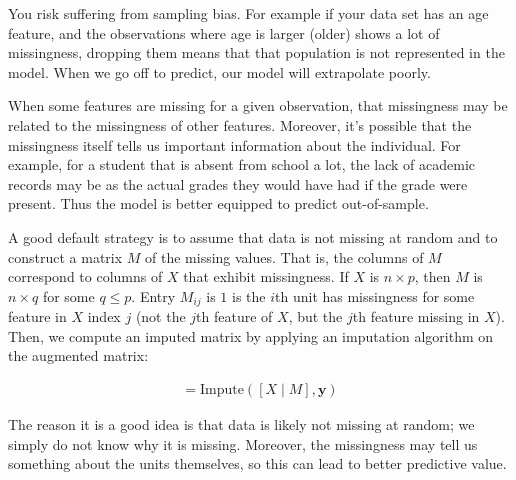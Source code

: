 \documentclass[12pt]{article}
\begin{document}
\begin{enumerate}


You risk suffering from sampling bias. For example if your data set has an age
feature, and the observations where age is larger (older) shows a lot of missingness,
dropping them means that that population is not represented in the model.
When we go off to predict, our model will extrapolate poorly.


When some features are missing for a given observation, that missingness may be related
to the missingness of other features. Moreover, it's possible that the missingness
itself tells us important information about the individual. For example,
for a student that is absent from school a lot, the lack of academic records
may be as the actual grades they would have had if the grade were present.
Thus the model is better equipped to predict out-of-sample.


A good default strategy is to assume that data is not missing at random and to
construct a matrix $M$ of the missing values. That is,
the columns of $M$ correspond to columns of $X$ that exhibit missingness.
If $X$ is $n\times p$, then $M$ is $n\times q$ for some $q\leq p$. Entry
$M_{ij}$ is $1$ is the $i$th unit has missingness for some feature in $X$
index $j$ (not the $j$th feature of $X$, but the $j$th feature missing
in $X$). Then, we compute an imputed matrix by applying an imputation algorithm
on the augmented matrix:

\begin{align*}
	[X_{\text{imp}} \mid M] = \text{Impute}([X \mid M], \bm{y})
\end{align*}

The reason it is a good idea is that data is likely not missing at random;
we simply do not know why it is missing. Moreover, the missingness may
tell us something about the units themselves, so this can lead to better
predictive value.

\end{enumerate}
\end{document}
